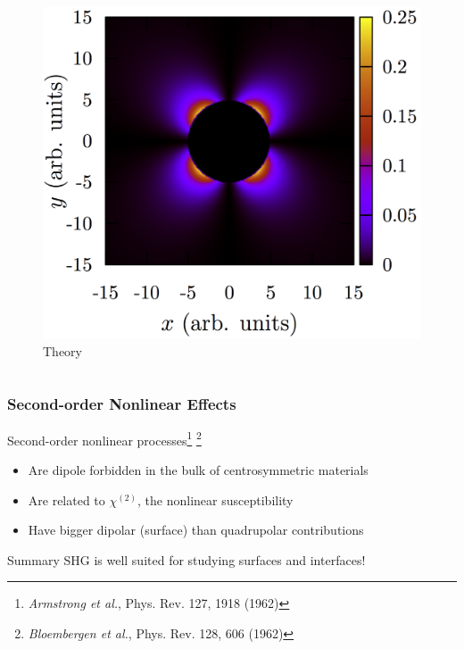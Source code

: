 \documentclass{beamer}
\begin{document}
\begin{frame}
\begin{columns}
\begin{figure}
\includegraphics[width=\textwidth]{image-bms}
\caption{Theory}
\end{figure}
\end{columns}
\end{frame}

\begin{frame}
\frametitle{Second-order Nonlinear Effects}
Second-order nonlinear processes\footnote{\emph{Armstrong et al.}, Phys. Rev.
127, 1918 (1962)}
\footnote{\emph{Bloembergen et al.}, Phys. Rev. 128, 606 (1962)}
\begin{itemize}
\item Are dipole forbidden in the bulk of centrosymmetric materials
\item Are related to $\chi^{(2)}$, the nonlinear susceptibility
\item Have bigger dipolar (surface) than quadrupolar contributions
\end{itemize}\vfill
\begin{block}{Summary}
SHG is well suited for studying surfaces and interfaces!
\end{block}
\end{frame}
\end{document}
